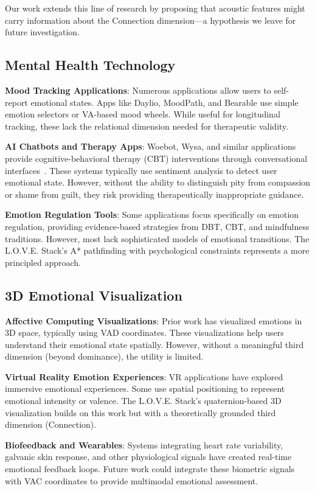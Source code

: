 \documentclass[10pt,twocolumn]{article}
\begin{document}
Our work extends this line of research by proposing that acoustic features might carry information about the Connection dimension—a hypothesis we leave for future investigation.

\subsection{Mental Health Technology}

\textbf{Mood Tracking Applications}: Numerous applications allow users to self-report emotional states. Apps like Daylio, MoodPath, and Bearable use simple emotion selectors or VA-based mood wheels. While useful for longitudinal tracking, these lack the relational dimension needed for therapeutic validity.

\textbf{AI Chatbots and Therapy Apps}: Woebot, Wysa, and similar applications provide cognitive-behavioral therapy (CBT) interventions through conversational interfaces~\cite{fitzpatrick2017}. These systems typically use sentiment analysis to detect user emotional state. However, without the ability to distinguish pity from compassion or shame from guilt, they risk providing therapeutically inappropriate guidance.

\textbf{Emotion Regulation Tools}: Some applications focus specifically on emotion regulation, providing evidence-based strategies from DBT, CBT, and mindfulness traditions. However, most lack sophisticated models of emotional transitions. The L.O.V.E. Stack's A* pathfinding with psychological constraints represents a more principled approach.

\subsection{3D Emotional Visualization}

\textbf{Affective Computing Visualizations}: Prior work has visualized emotions in 3D space, typically using VAD coordinates. These visualizations help users understand their emotional state spatially. However, without a meaningful third dimension (beyond dominance), the utility is limited.

\textbf{Virtual Reality Emotion Experiences}: VR applications have explored immersive emotional experiences. Some use spatial positioning to represent emotional intensity or valence. The L.O.V.E. Stack's quaternion-based 3D visualization builds on this work but with a theoretically grounded third dimension (Connection).

\textbf{Biofeedback and Wearables}: Systems integrating heart rate variability, galvanic skin response, and other physiological signals have created real-time emotional feedback loops. Future work could integrate these biometric signals with VAC coordinates to provide multimodal emotional assessment.
\end{document}
